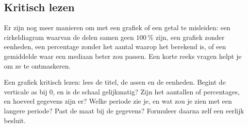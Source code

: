 \begin{oefeningen}
\end{oefeningen}

\subsection{Kritisch lezen}

Er zijn nog meer manieren om met een grafiek of een getal te misleiden: een cirkeldiagram waarvan de delen samen geen $100~\%$ zijn, een grafiek zonder eenheden, een percentage zonder het aantal waarop het berekend is, of een gemiddelde waar een mediaan beter zou passen. Een korte reeks vragen helpt je om ze te ontmaskeren.

\begin{werkwijze}
Een grafiek kritisch lezen: lees de titel, de assen en de eenheden. Begint de verticale as bij 0, en is de schaal gelijkmatig? Zijn het aantallen of percentages, en hoeveel gegevens zijn er? Welke periode zie je, en wat zou je zien met een langere periode? Past de maat bij de gegevens? Formuleer daarna zelf een eerlijk besluit.
\end{werkwijze}


\begin{oefeningen}
\end{oefeningen}

\opdrachtenkop

